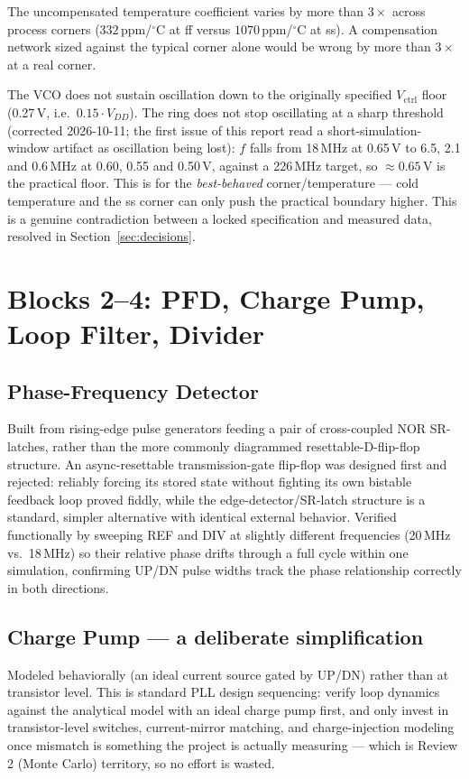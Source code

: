 \documentclass[11pt]{article}
\begin{document}
\begin{finding}
The uncompensated temperature coefficient varies by more than $3\times$ across process corners ($332$\,ppm/$^\circ$C at ff versus $1070$\,ppm/$^\circ$C at ss). A compensation network sized against the typical corner alone would be wrong by more than $3\times$ at a real corner.
\end{finding}

\begin{risk}
The VCO does not sustain oscillation down to the originally specified $V_{\text{ctrl}}$ floor (0.27\,V, i.e.\ $0.15\cdot V_{DD}$). The ring does not stop oscillating at a sharp threshold (corrected 2026-10-11; the first issue of this report read a short-simulation-window artifact as oscillation being lost): $f$ falls from 18\,MHz at 0.65\,V to 6.5, 2.1 and 0.6\,MHz at 0.60, 0.55 and 0.50\,V, against a 226\,MHz target, so $\approx 0.65$\,V is the practical floor. This is for the \emph{best-behaved} corner/temperature --- cold temperature and the ss corner can only push the practical boundary higher. This is a genuine contradiction between a locked specification and measured data, resolved in Section~\ref{sec:decisions}.
\end{risk}

\section{Blocks 2--4: PFD, Charge Pump, Loop Filter, Divider}

\subsection{Phase-Frequency Detector}
Built from rising-edge pulse generators feeding a pair of cross-coupled NOR SR-latches, rather than the more commonly diagrammed resettable-D-flip-flop structure. An async-resettable transmission-gate flip-flop was designed first and rejected: reliably forcing its stored state without fighting its own bistable feedback loop proved fiddly, while the edge-detector/SR-latch structure is a standard, simpler alternative with identical external behavior. Verified functionally by sweeping REF and DIV at slightly different frequencies (20\,MHz vs.\ 18\,MHz) so their relative phase drifts through a full cycle within one simulation, confirming UP/DN pulse widths track the phase relationship correctly in both directions.

\subsection{Charge Pump --- a deliberate simplification}
Modeled behaviorally (an ideal current source gated by UP/DN) rather than at transistor level. This is standard PLL design sequencing: verify loop dynamics against the analytical model with an ideal charge pump first, and only invest in transistor-level switches, current-mirror matching, and charge-injection modeling once mismatch is something the project is actually measuring --- which is Review 2 (Monte Carlo) territory, so no effort is wasted.
\end{document}

